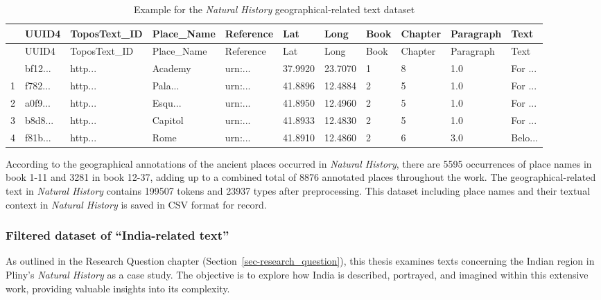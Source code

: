 \documentclass[
  12pt,
]{article}
\begin{document}
\hypertarget{tbl-dataset_geotext}{}
\begin{longtable}[]{@{}lllllllllll@{}}
\caption{\label{tbl-dataset_geotext}Example for the \emph{Natural
History} geographical-related text dataset}\tabularnewline
\toprule\noalign{}
& UUID4 & ToposText\_ID & Place\_Name & Reference & Lat & Long & Book &
Chapter & Paragraph & Text \\
\midrule\noalign{}
\endfirsthead
\toprule\noalign{}
& UUID4 & ToposText\_ID & Place\_Name & Reference & Lat & Long & Book &
Chapter & Paragraph & Text \\
\midrule\noalign{}
\endhead
\bottomrule\noalign{}
\endlastfoot
0 & bf12... & http... & Academy & urn:... & 37.9920 & 23.7070 & 1 & 8 &
1.0 & For ... \\
1 & f782... & http... & Pala... & urn:... & 41.8896 & 12.4884 & 2 & 5 &
1.0 & For ... \\
2 & a0f9... & http... & Esqu... & urn:... & 41.8950 & 12.4960 & 2 & 5 &
1.0 & For ... \\
3 & b8d8... & http... & Capitol & urn:... & 41.8933 & 12.4830 & 2 & 5 &
1.0 & For ... \\
4 & f81b... & http... & Rome & urn:... & 41.8910 & 12.4860 & 2 & 6 & 3.0
& Belo... \\
\end{longtable}

According to the geographical annotations of the ancient places occurred
in \emph{Natural History}, there are 5595 occurrences of place names in
book 1-11 and 3281 in book 12-37, adding up to a combined total of 8876
annotated places throughout the work. The geographical-related text in
\emph{Natural History} contains 199507 tokens and 23937 types after
preprocessing. This dataset including place names and their textual
context in \emph{Natural History} is saved in CSV format for record.

\hypertarget{filtered-dataset-of-india-related-text}{%
\subsubsection{Filtered dataset of ``India-related
text''}\label{filtered-dataset-of-india-related-text}}

As outlined in the Research Question chapter
(Section~\ref{sec-research_question}), this thesis examines texts
concerning the Indian region in Pliny's \emph{Natural History} as a case
study. The objective is to explore how India is described, portrayed,
and imagined within this extensive work, providing valuable insights
into its complexity.
\end{document}
